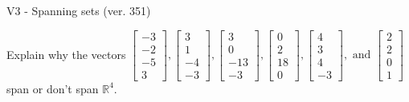 \begin{exercise}
  \begin{exerciseTitle}V3 - Spanning sets (ver. 351)\end{exerciseTitle}
  \begin{exerciseStatement}
    Explain why the vectors \(\left[\begin{array}{r}
-3 \\
-2 \\
-5 \\
3
\end{array}\right] , \left[\begin{array}{r}
3 \\
1 \\
-4 \\
-3
\end{array}\right] , \left[\begin{array}{r}
3 \\
0 \\
-13 \\
-3
\end{array}\right] , \left[\begin{array}{r}
0 \\
2 \\
18 \\
0
\end{array}\right] , \left[\begin{array}{r}
4 \\
3 \\
4 \\
-3
\end{array}\right] , \text{ and } \left[\begin{array}{r}
2 \\
2 \\
0 \\
1
\end{array}\right]\) span or don't span \(\mathbb{R}^4\). 
	



\end{exerciseStatement}
\end{exercise}
